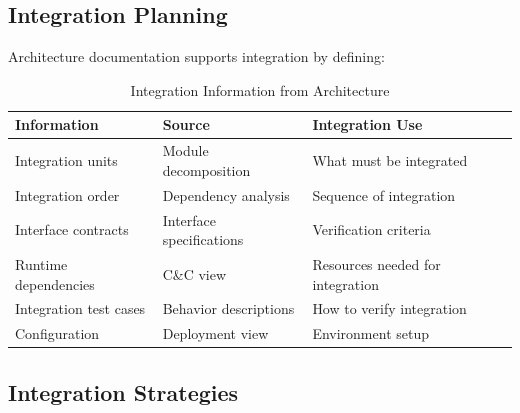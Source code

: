 \documentclass[11pt]{article}
\begin{document}
\subsection{Integration Planning}

Architecture documentation supports integration by defining:

\begin{longtable}{@{}L{3cm} L{4.5cm} L{5cm}@{}}
\caption{Integration Information from Architecture} \\
\toprule
\textbf{Information} & \textbf{Source} & \textbf{Integration Use} \\
\midrule
\endfirsthead
\bottomrule
\endlastfoot
Integration units & Module decomposition & What must be integrated \\
Integration order & Dependency analysis & Sequence of integration \\
Interface contracts & Interface specifications & Verification criteria \\
Runtime dependencies & C\&C view & Resources needed for integration \\
Integration test cases & Behavior descriptions & How to verify integration \\
Configuration & Deployment view & Environment setup \\
\end{longtable}

\subsection{Integration Strategies}
\end{document}
